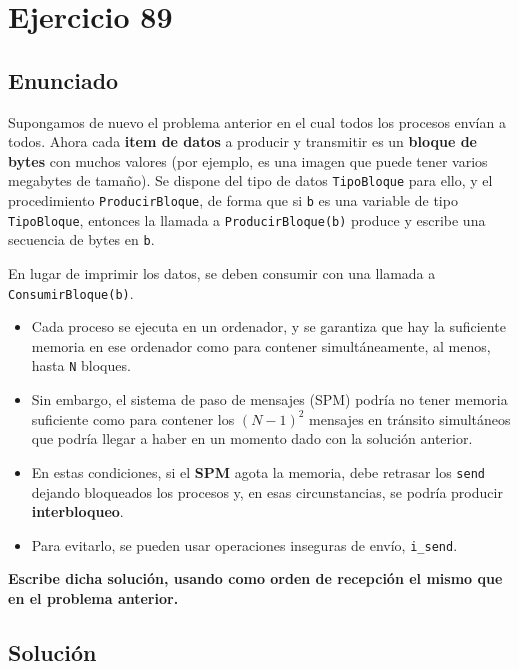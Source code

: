 \documentclass[a4paper,12pt]{article}
\begin{document}
\section{Ejercicio 89}

\subsection{Enunciado}

Supongamos de nuevo el problema anterior en el cual todos los procesos envían a todos. Ahora cada \textbf{item de datos} a producir y transmitir es un \textbf{bloque de bytes} con muchos valores (por ejemplo, es una imagen que puede tener varios megabytes de tamaño). Se dispone del tipo de datos \texttt{TipoBloque} para ello, y el procedimiento \texttt{ProducirBloque}, de forma que si \texttt{b} es una variable de tipo \texttt{TipoBloque}, entonces la llamada a \texttt{ProducirBloque(b)} produce y escribe una secuencia de bytes en \texttt{b}. 

En lugar de imprimir los datos, se deben consumir con una llamada a \texttt{ConsumirBloque(b)}.

\begin{itemize}
    \item Cada proceso se ejecuta en un ordenador, y se garantiza que hay la suficiente memoria en ese ordenador como para contener simultáneamente, al menos, hasta \texttt{N} bloques.
    \item Sin embargo, el sistema de paso de mensajes (SPM) podría no tener memoria suficiente como para contener los \((N - 1)^2\) mensajes en tránsito simultáneos que podría llegar a haber en un momento dado con la solución anterior.
    \item En estas condiciones, si el \textbf{SPM} agota la memoria, debe retrasar los \texttt{send} dejando bloqueados los procesos y, en esas circunstancias, se podría producir \textbf{interbloqueo}.
    \item Para evitarlo, se pueden usar operaciones inseguras de envío, \texttt{i\_send}. 
\end{itemize}

\textbf{Escribe dicha solución, usando como orden de recepción el mismo que en el problema anterior.}




\subsection{Solución}
\end{document}
